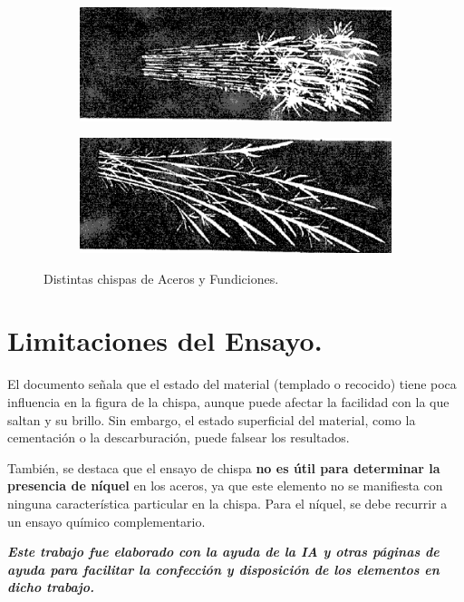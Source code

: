 \documentclass[12pt,a4paper]{article}
\begin{document}
\begin{figure}[h!]
\begin{subfigure}{0.45\textwidth}
        \includegraphics[width=\textwidth]{Figuras/gris.png}
        \label{fig:gris}
    \end{subfigure}
    \begin{subfigure}{0.8\textwidth}
        \centering
        \includegraphics[width=\textwidth]{Figuras/maleable.png}
        \label{fig:maleable}
    \end{subfigure}
    \caption{Distintas chispas de Aceros y Fundiciones.}
    \label{fig:aceros_y_fundiciones}
\end{figure}

\section{Limitaciones del Ensayo.}

El documento señala que el estado del material (templado o recocido) tiene poca influencia en la figura de la chispa, aunque puede afectar la facilidad con la que saltan y su brillo. Sin embargo, el estado superficial del material, como la cementación o la descarburación, puede falsear los resultados.


También, se destaca que el ensayo de chispa \textbf{no es útil para determinar la presencia de níquel} en los aceros, ya que este elemento no se manifiesta con ninguna característica particular en la chispa. Para el níquel, se debe recurrir a un ensayo químico complementario.

\vfill
\textit{\textbf{Este trabajo fue elaborado con la ayuda de la IA y otras páginas de ayuda para facilitar la confección y disposición de los elementos en dicho trabajo.}}
\end{document}
